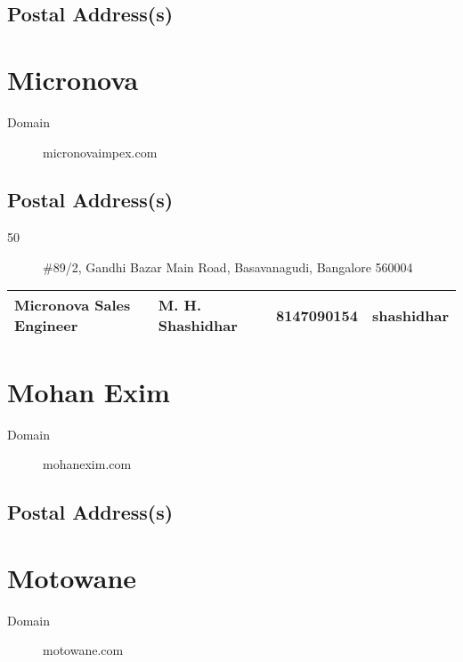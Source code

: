 \documentclass[a4paper, 11pt, twoside]{book}
\begin{document}
\subsection*{Postal Address(s)}
\section{Micronova}\label{com:37}
\begin{description}
\item[Domain]micronovaimpex.com
\end{description}
\subsection*{Postal Address(s)}
\begin{description}
\item [50]\#89/2, Gandhi Bazar Main Road, Basavanagudi, Bangalore 560004
\end{description}
\begin{tabular}{|p{4cm}|p{2cm}|p{2cm}|p{3cm}|}
\hline
Micronova Sales Engineer & M. H. Shashidhar & 8147090154 & shashidhar \\ \hline
\end{tabular}
\section{Mohan Exim}\label{com:48}
\begin{description}
\item[Domain]mohanexim.com
\end{description}
\subsection*{Postal Address(s)}
\section{Motowane}\label{com:35}
\begin{description}
\item[Domain]motowane.com
\end{description}
\end{document}
